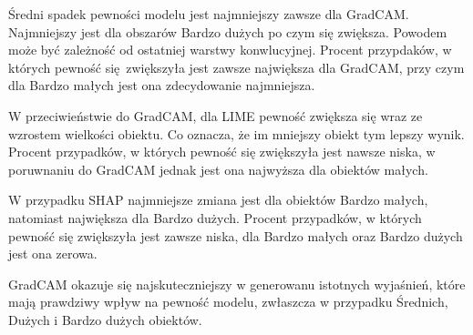 Średni spadek pewności modelu jest najmniejszy zawsze dla GradCAM.
Najmniejszy jest dla obszarów Bardzo dużych po czym się zwiększa.
Powodem może być zależność od ostatniej warstwy konwlucyjnej.
Procent przypdaków, w których pewność się zwiększyła jest zawsze największa dla GradCAM, przy czym dla Bardzo małych jest ona zdecydowanie najmniejsza.

W przeciwieństwie do GradCAM, dla LIME pewność zwiększa się wraz ze wzrostem wielkości obiektu.
Co oznacza, że im mniejszy obiekt tym lepszy wynik.
Procent przypadków, w których pewność się zwiększyła jest nawsze niska, w poruwnaniu do GradCAM jednak jest ona najwyższa dla obiektów małych.

W przypadku SHAP najmniejsze zmiana jest dla obiektów Bardzo małych, natomiast największa dla Bardzo dużych.
Procent przypadków, w których pewność się zwiększyła jest zawsze niska, dla Bardzo małych oraz Bardzo dużych jest ona zerowa.

GradCAM okazuje się najskuteczniejszy w generowanu istotnych wyjaśnień, które mają prawdziwy wpływ na pewność modelu, zwłaszcza w przypadku Średnich, Dużych i Bardzo dużych obiektów.

\vspace{1cm}

